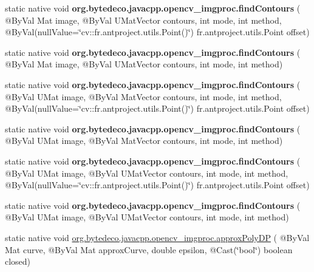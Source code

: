 \begin{DoxyCompactItemize}
static native void {\bfseries org.\+bytedeco.\+javacpp.\+opencv\+\_\+imgproc.\+find\+Contours} ( @By\+Val Mat image, @By\+Val U\+Mat\+Vector contours, int mode, int method, @By\+Val(null\+Value=\char`\"{}cv\+::\+fr.antproject.utils.Point()\char`\"{}) fr.antproject.utils.Point offset)
\item 
\mbox{\label{group__imgproc__shape_ga7e50eb8f5267eacbdc6b9b222c7934fc}} 
static native void {\bfseries org.\+bytedeco.\+javacpp.\+opencv\+\_\+imgproc.\+find\+Contours} ( @By\+Val Mat image, @By\+Val U\+Mat\+Vector contours, int mode, int method)
\item 
\mbox{\label{group__imgproc__shape_ga6cfd4f0c2df93afd8eeb329c719ac9fd}} 
static native void {\bfseries org.\+bytedeco.\+javacpp.\+opencv\+\_\+imgproc.\+find\+Contours} ( @By\+Val U\+Mat image, @By\+Val Mat\+Vector contours, int mode, int method, @By\+Val(null\+Value=\char`\"{}cv\+::\+fr.antproject.utils.Point()\char`\"{}) fr.antproject.utils.Point offset)
\item 
\mbox{\label{group__imgproc__shape_ga8ea1fd66bd5d44f0f7fe9df754847086}} 
static native void {\bfseries org.\+bytedeco.\+javacpp.\+opencv\+\_\+imgproc.\+find\+Contours} ( @By\+Val U\+Mat image, @By\+Val Mat\+Vector contours, int mode, int method)
\item 
\mbox{\label{group__imgproc__shape_ga9b9d5914bec73025c51f73c6e1f189dc}} 
static native void {\bfseries org.\+bytedeco.\+javacpp.\+opencv\+\_\+imgproc.\+find\+Contours} ( @By\+Val U\+Mat image, @By\+Val U\+Mat\+Vector contours, int mode, int method, @By\+Val(null\+Value=\char`\"{}cv\+::\+fr.antproject.utils.Point()\char`\"{}) fr.antproject.utils.Point offset)
\item 
\mbox{\label{group__imgproc__shape_ga4c289193c5c5377d64ceb90e41ee5e78}} 
static native void {\bfseries org.\+bytedeco.\+javacpp.\+opencv\+\_\+imgproc.\+find\+Contours} ( @By\+Val U\+Mat image, @By\+Val U\+Mat\+Vector contours, int mode, int method)
\item 
static native void \hyperlink{group__imgproc__shape_ga59b2a13c4f741e0898f8415d9436d8a0}{org.\+bytedeco.\+javacpp.\+opencv\+\_\+imgproc.\+approx\+Poly\+DP} ( @By\+Val Mat curve, @By\+Val Mat approx\+Curve, double epsilon, @Cast(\char`\"{}bool\char`\"{}) boolean closed)

\end{DoxyCompactItemize}
